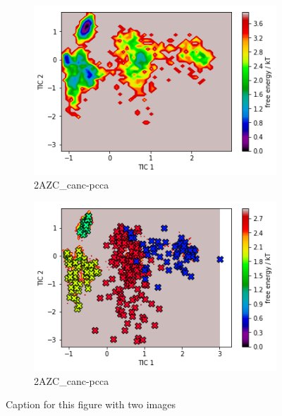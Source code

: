 \documentclass[fleqn,10pt]{wlscirep}
\begin{document}
\begin{figure}[!ht]
\centering
\begin{subfigure}{.5\textwidth}
  \centering
  \includegraphics[width=.9\linewidth]{2AZC_canc/2AZC_canc-tica.png}
  \caption{2AZC_{canc}-pcca}
  \label{fig:2AZC_canc-tica}
\end{subfigure}%
\begin{subfigure}{.5\textwidth}
  \centering
  \includegraphics[width=.9\linewidth]{2AZC_canc/2AZC_canc-pcca.png}
  \caption{2AZC_{canc}-pcca}
  \label{fig:2AZC_canc-pcca}
\end{subfigure}
\caption{Caption for this figure with two images}
\label{fig:2AZC_canc-cluster}
\end{figure}
\end{document}
